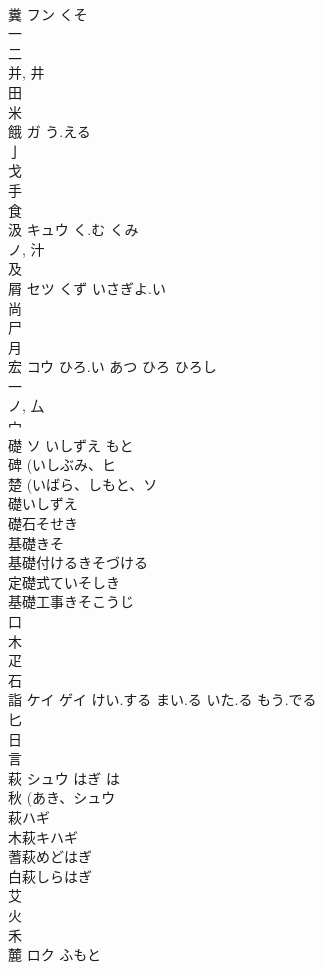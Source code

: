 \documentclass[8pt]{extreport}
\begin{document}
\begin{CJK}{UTF8}{min}
\\	糞	フン	くそ	
\\	一 
\\	二 
\\	并, 井 
\\	田 
\\	米 
\\	餓	ガ	う.える	
\\	亅 
\\	戈 
\\	手 
\\	食 
\\	汲	キュウ	く.む くみ	
\\	ノ, 汁 
\\	及 
\\	屑	セツ	くず いさぎよ.い	
\\	尚 
\\	尸 
\\	月 
\\	宏	コウ	ひろ.い あつ ひろ ひろし	
\\	一 
\\	ノ, 厶 
\\	宀 
\\	礎	ソ	いしずえ もと	
\\	碑 (いしぶみ、ヒ 
\\	楚 (いばら、しもと、ソ 
\\	礎いしずえ
\\	礎石そせき
\\	基礎きそ
\\	基礎付けるきそづける
\\	定礎式ていそしき
\\	基礎工事きそこうじ
\\	口 
\\	木 
\\	疋 
\\	石 
\\	詣	ケイ ゲイ	けい.する まい.る いた.る もう.でる	
\\	匕 
\\	日 
\\	言 
\\	萩	シュウ	はぎ は	
\\	秋 (あき、シュウ 
\\	萩ハギ 
\\	木萩キハギ 
\\	蓍萩めどはぎ 
\\	白萩しらはぎ 
\\	艾 
\\	火 
\\	禾 
\\	麓	ロク	ふもと	

\end{CJK}
\end{document}

